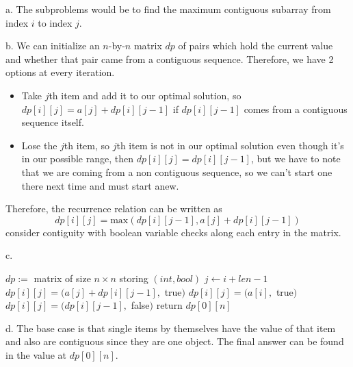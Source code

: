 \documentclass[12pt]{article}
\begin{document}
a. The subproblems would be to find the maximum contiguous subarray from index $i$ to index $j$.

b. We can initialize an $n$-by-$n$ matrix $dp$ of pairs which hold the current value and whether that pair came from a contiguous sequence. Therefore, we have 2 options at every iteration.
\begin{itemize}
    \item Take $j$th item and add it to our optimal solution, so $dp[i][j] = a[j] + dp[i][j-1]$ if $dp[i][j-1]$ comes from a contiguous sequence itself.
    \item Lose the $j$th item, so $j$th item is not in our optimal solution even though it's in our possible range, then $dp[i][j] = dp[i][j-1]$, but we have to note that we are coming from a non contiguous sequence, so we can't start one there next time and must start anew.
\end{itemize}
Therefore, the recurrence relation can be written as
$$
dp[i][j] = \text{max} (dp[i][j-1], a[j]+dp[i][j-1])
$$
consider contiguity with boolean variable checks along each entry in the matrix.

c.
\begin{algorithmic}
        \State $dp:=$ matrix of size $n \times n$ storing $(int,bool)$
            \State $j \gets i+len-1$
                    \State $dp[i][j] = (a[j]+dp[i][j-1],$ true$)$
                    \State $dp[i][j] = (a[i],$ true$)$
                \Else
                    \State $dp[i][j] = (dp[i][j-1],$ false$)$
                \EndIf
           \EndFor
        \EndFor
        \State return $dp[0][n]$
    \EndProcedure
\end{algorithmic}

d. The base case is that single items by themselves have the value of that item and also are contiguous since they are one object. The final answer can be found in the value at $dp[0][n]$.
\end{document}
